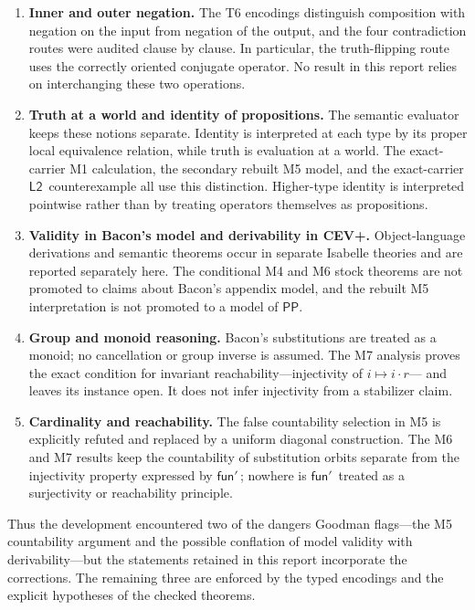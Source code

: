 \documentclass[12pt,leqno]{article}
\theoremstyle{plain}
\theoremstyle{definition}
\newcommand{\funp}{\ensuremath{\mathsf{fun}'\,}}
\newcommand{\PP}{\ensuremath{\mathsf{PP}}}
\newcommand{\Ltwo}{\ensuremath{\mathsf{L2}}}
\begin{document}
\begin{enumerate}
\item \textbf{Inner and outer negation.}
      The T6 encodings distinguish composition with negation on the input from
      negation of the output, and the four contradiction routes were audited
      clause by clause.  In particular, the truth-flipping route uses the
      correctly oriented conjugate operator.  No result in this report relies
      on interchanging these two operations.
\item \textbf{Truth at a world and identity of propositions.}
      The semantic evaluator keeps these notions separate.  Identity is
      interpreted at each type by its proper local equivalence relation, while
      truth is evaluation at a world.  The exact-carrier M1 calculation, the
      secondary rebuilt M5 model, and the exact-carrier \Ltwo\ counterexample
      all use this distinction.
      Higher-type identity is interpreted pointwise rather than by treating
      operators themselves as propositions.
\item \textbf{Validity in Bacon's model and derivability in CEV+.}
      Object-language derivations and semantic theorems occur in separate
      Isabelle theories and are reported separately here.  The conditional
      M4 and M6 stock theorems are not promoted to claims about Bacon's
      appendix model, and the rebuilt M5 interpretation is not promoted to a
      model of \PP.
\item \textbf{Group and monoid reasoning.}
      Bacon's substitutions are treated as a monoid; no cancellation or group
      inverse is assumed.  The M7 analysis proves the exact condition for
      invariant reachability---injectivity of \(i\mapsto i\mathbin{\cdot}r\)---
      and leaves its instance open.  It does not infer injectivity from a
      stabilizer claim.
\item \textbf{Cardinality and reachability.}
      The false countability selection in M5 is explicitly refuted and
      replaced by a uniform diagonal construction.  The M6 and M7 results keep
      the countability of substitution orbits separate from the injectivity
      property expressed by \(\funp\); nowhere is \(\funp\) treated as a
      surjectivity or reachability principle.
\end{enumerate}

\noindent
Thus the development encountered two of the dangers Goodman flags---the M5
countability argument and the possible conflation of model validity with
derivability---but the statements retained in this report incorporate the
corrections.  The remaining three are enforced by the typed encodings and the
explicit hypotheses of the checked theorems.
\end{document}
